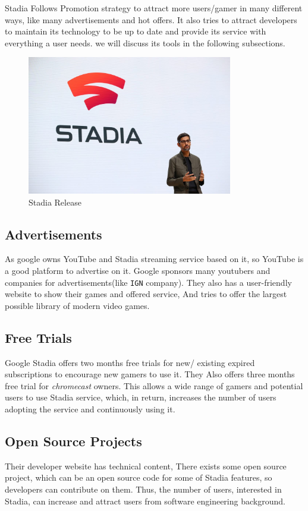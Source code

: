 Stadia Follows  Promotion strategy to attract more users/gamer in many different ways,
like many advertisements and hot offers. It also tries to attract developers to maintain its technology to be up to date and provide its service with everything a user needs.
we will discuss its tools in the following subsections.

\begin{figure}[h]
    \centering
    \includegraphics[width=0.8\textwidth]{images/release.jpeg}
    \caption{Stadia Release}
    \label{fig:release}
\end{figure}

\subsection{Advertisements}
As google owns YouTube and Stadia streaming service based on it, so YouTube is a good platform to advertise on it. Google sponsors many youtubers and companies for advertisements(like \texttt{IGN} company). They also has a user-friendly website to show their games and offered service, And tries to offer the largest possible library of modern video games.

\subsection{Free Trials}
Google Stadia offers two months free trials for new/ existing expired subscriptions to encourage new gamers to use it. They Also offers three months free trial for \emph{chromecast} owners. This allows a wide range of gamers and potential users to use Stadia service, which, in return, increases the number of users adopting the service and continuously using it.

\subsection{Open Source Projects}
Their developer website has technical content, There exists some open source project, which can be an open source code for some of Stadia features, so developers can contribute on them. Thus, the number of users, interested in Stadia, can increase and attract users from software engineering background.